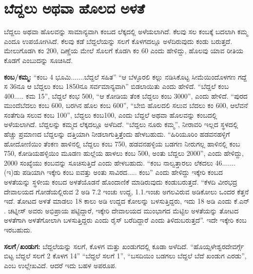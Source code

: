 \section{ಬೆದ್ದಲು ಅಥವಾ ಹೊಲದ ಅಳತೆ}

ಬೆದ್ದಲು ಅಥವಾ ಹೊಲವನ್ನು ಸಾಮಾನ್ಯವಾಗಿ ಕಂಬದ ಲೆಕ್ಕದಲ್ಲಿ ಅಳೆಯಲಾಗಿದೆ. ಕೆಲವು ಸಲ ಕಂಬಕ್ಕೆ ಬದಲಾಗಿ ಕಮ್ಮ ಎಂದೂ ಉಪಯೋಗಿಸಿದೆ. ಕೆಲವು ಕಡೆ ಬೆದ್ದಲೆಯನ್ನು ಸಲಗೆ ಕೊಳಗದಲ್ಲೂ ಅಳೆದಿರುವುದು ಕಂಡು ಬರುತ್ತದೆ. ಮೇಲುಗೊಡಗಿ ಕಂ 200, ದಿಣ್ಣೆಯ ಮೇಲೆ ಸೊಲಗೆ ಕೊಡಗಿ ಕಂ 60 ಎಂದು ಹೇಳಿದ್ದು, ಹೊಲವು ಯಾವ ರೀತಿಯ ಕೊಡಗೆ ಎಂಬುದನ್ನು ಸೂಚಿಸಿದೆ.

\textbf{ಕಂಬ/ಕಮ್ಮ:} “ಕಂಬ 4 ಭೂಮಿ.......ಬೆದ್ದಲೆ ಸಹಿತ” “ಆ ಬೆಳ್ಳೂರಲಿ ಕಲ್ಲು ನಡಿಸಿಕೊಟ್ಟ ಸೀಮೆಯಿಂದೊಳಗಣ ಗದ್ದೆ ಸ 36ನೂ ಆ ಬೆದ್ದಲು ಕಂಬ 1850ನೂ ಸರ್ವಮಾನ್ಯವಾಗಿ” ಬಿಡಲಾಯಿತು ಎಂದು ಹೇಳಿದೆ. “ಬೆದ್ದಲೆ ಕಂಬ 400..... ಕಮ 15”, ಬೆದ್ದಲೆ ಕಂಭ 500, “ಆ ಕೋಡಿಯ ತೆಂಕ ಬೆದ್ದಲು ಕಂಬ 3000”, ಎಂದು ಹೇಳಿದೆ. “ಪುರದ ಮುಂದೆ\break ಬೆದಲು ಕಂಬ 600, ಬರಗಿನ ಹೊಲ ಕಂಬ 600”, “ಬೇಬಿ ಹೊಲದಲಿ ಸಲುವ ಬೆದಲು ಕಂ 600, ಆಲೆವನೆ ಸಂತೆಗುಡಿ ಸಲುವ ಕಂಬ 100”, ಬೆದ್ದಲು ಕಂಬ100, ಎಂದು ಬೆದ್ದಲೆ ಅಥವಾ ಹೊಲವನ್ನು ಕಂಬದಲ್ಲಿ ಅಳೆಯಲಾಗಿದೆ. ಬೆದ್ದಲನ್ನು ಕಮ್ಮದ ಲೆಕ್ಕದಲ್ಲೂ ಅಳೆದಿದೆ. “ಬೆದ್ದಲು ನೂರು ಕಮ್ಮ”, ನೀರಾವರಿ ಇಲ್ಲದ ಸ್ಥಳದಲ್ಲಿ ಹೆಚ್ಚು ಪ್ರಮಾಣದ ಬೆದ್ದಲನ್ನು ದತ್ತಿಯಾಗಿ ನೀಡಲಾಗುತ್ತಿತ್ತೆಂದು ಹೇಳಬಹುದು. “ಹಿರಿಯೂರಿಂ ಹಡವನಹಳ್ಳಿಗೆ ಹೋದೋಣಿಯಿಂ ತೆಂಕಣ ಹಾಳಿನಲ್ಲಿ ಬೆದ್ದಲು ಕಂಬ 750, ಹಡವನಹಳ್ಳಿಯ ಬಡಗಣ ನೀರುಗಲ್ಲ ಹಾಳಿನಲ್ಲಿ ಕಂಬ 750, ಕೋಡಿಯಹಳ್ಳಿಯಿಂ ಮೂಡಣ ಹುಲ್ಲೆಯ ಹಾಳಲು ಕಂಬ 500, ಅಂತು ಬೆದ್ದಲು 2000”, ಎಂದು ಹೇಳಿದ್ದು, 2000 ಸಂಖ್ಯೆಯು ಕಂಬವನ್ನು ಸೂಚಿಸುತ್ತಿದೆ ಎಂದು ಹೇಳಬಹುದು. “ಕಂಬ ನಾಲ್ವತ್ತಾರಲು ಲೆಕದಲು 46.......(ಇ)ಡು ಪಡಿಯಾಗಿ ಇಕ್ಕೇರಿ ಕಂಬ ಐವತ್ತು ಅಂತು ಸಾವಿರದ..... ಕಂಬ” ಎಂದು ಹೇಳಿದ್ದು ಇಕ್ಕೇರಿ ಕಂಬದ ಅಳತೆಯನ್ನು ಸ್ಥಳೀಯ ಕಂಬದ ಅಳತೆಯೊಡನೆ ಹೊಂದಾಣಿಕೆ ಮಾಡಿರುವುದು ಕಂಡುಬರುತ್ತದೆ. “ಕೆಳದಿ ವೀರಭದ್ರ ದೇವಾಲಯದ ಗೋಡೆಯಲ್ಲಿರುವ 2 ಅಡಿ 7.2 ಇಂಚು ಉದ್ದ, 1.1.ಇಂಚು ಅಗಲವಿರುವ ಅಡಿಕೋಲು ಒಂದರ ಕೆತ್ತನೆ ಇದೆ. ತೋಟದ ಅಳತೆ ಮಾಡಲು 18 ಕಾಲು ಅಡಿ ಉದ್ದದ ಕೋಲನ್ನು ಬಳಸುತ್ತಿದ್ದರು, ಇದು 18 ಅಡಿ ಎಂದು ಕೆ.ಎನ್​. ಚಟ್ನೀಸ್​ ಅವರು ಅಭಿಪ್ರಾಯ ಪಟ್ಟಿದ್ದಾರೆ, ಇಕ್ಕೇರಿ ದೇವಾಲಯದ ಮುಂಭಾಗದ ಮೆಟ್ಟಿಲ ಅಳತೆಯನ್ನು ತೋಟದ ಅಳತೆಗಾಗಿ ಅಳತೆಗೋಲಾಗಿ ಬಳಸುತ್ತಿದ್ದರು ಎಂದು ರೈಸ್​ ಬರೆದಿದ್ದಾರೆ ಎಂದು ತಿಳಿದುಬರುತ್ತದೆ”. ಇದೇ ಇಕ್ಕೇರಿ ಕಂಬ ಇರಬಹುದು.

\textbf{ಸಲಗೆ/ಖಂಡುಗ:} ಬೆದ್ದಲೆಯನ್ನು ಸಲಗೆ, ಕೊಳಗ ಮತ್ತು ಖಂಡುಗದಲ್ಲಿ ಕೂಡಾ ಅಳೆದಿದೆ. “ಹೊಯ್ಸಳೇಶ್ವರ\break ದೇವರ್ಗ್ಗೆ ಬಿಟ್ಟ ಬೆದ್ದಲೆ ಸಲಗೆ 2 ಕೊಳಗ 14” “ಬೆದ್ದಲೆ ಸಲಗೆ 1”, “ಬಸದಿಯಿಂ ಬಡಗಲು ಬೆದ್ದಲೆ ಬೆದೆ ಖಂಡುಗ ಎರಡು”, ಎಂಬ ಉಲ್ಲೇಖವಿದೆ. ಆದರೆ ಇದು ಬಹಳ ಅಪರೂಪ.

